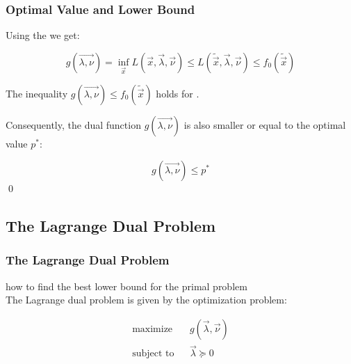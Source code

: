   
\begin{frame}
  \frametitle{Optimal Value and Lower Bound \cont}
  
  Using the  we get:
  
  \begin{displaymath}
    g(\vec{\lambda,\nu}) = 
    \inf_{{\vec{x}}} L({\vec{x}},\vec{\lambda}, \vec{\nu}) \leq
    L(\tilde{\vec{x}}, \vec{\lambda}, \vec{\nu}) \leq
    f_0(\tilde{\vec{x}})
  \end{displaymath}
  \pause
  
  \vspace{.25cm}
  The inequality $g(\vec{\lambda,\nu}) \leq f_0(\tilde{\vec{x}})$ holds for .\\[.5cm]
  \pause

  Consequently, the dual function $g(\vec{\lambda,\nu})$ is also smaller or equal to the optimal value $p^*$:
  
  \begin{displaymath}
    g(\vec{\lambda,\nu}) \leq p^*
  \end{displaymath}
  \hfill \qed %
\end{frame}


\subsection{The Lagrange Dual Problem}

\begin{frame}
  \frametitle{The Lagrange Dual Problem}
 
   how to find the best lower bound for the primal problem \\[1cm]
 
  The Lagrange dual problem is given by the optimization problem:
  
  \begin{eqnarray*}
    \mbox{maximize}   & & g(\vec{\lambda}, \vec{\nu}) \\[.3cm]
    \mbox{subject to} & & \vec{\lambda}\succeq 0
  \end{eqnarray*}
\end{frame}


